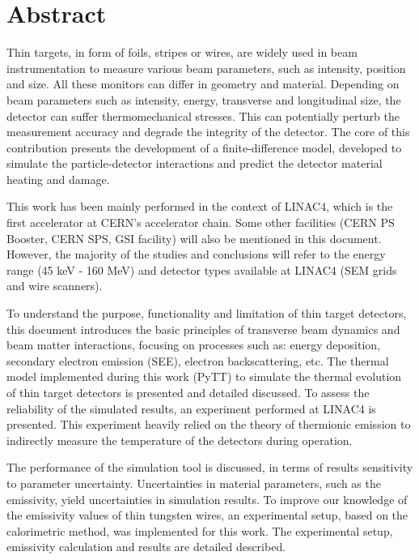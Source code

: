 
\chapter*{Abstract} \label{Abstract}

Thin targets, in form of foils, stripes or wires, are widely used 
in beam instrumentation to measure various beam parameters, such as intensity, position and size. All these monitors can differ in geometry and material. 
Depending on beam parameters such as intensity, energy, transverse and longitudinal size, the detector can suffer thermomechanical stresses. This can potentially perturb the measurement accuracy and degrade the integrity of the detector. The core of this contribution presents the development of a finite-difference model, developed to simulate the particle-detector interactions and predict the detector material heating and damage. 

This work has been mainly performed in the context of LINAC4, which is the first accelerator at CERN's accelerator chain. Some other facilities (CERN PS Booster, CERN SPS, GSI facility) will also be mentioned in this document. However, the majority of the studies and conclusions will refer to the energy range (45 keV - 160 MeV) and detector types available at LINAC4 (SEM grids and wire scanners). 

To understand the purpose, functionality and limitation of thin target detectors, this document introduces the basic principles of transverse beam dynamics and beam matter interactions, focusing on processes such as: energy deposition, secondary electron emission (SEE), electron backscattering, etc. The thermal model implemented during this work (PyTT) to simulate the thermal evolution of thin target detectors is presented and detailed discussed. To assess the reliability of the simulated results, an experiment performed at LINAC4 is presented. This experiment heavily relied on the theory of thermionic emission to indirectly measure the temperature of the detectors during operation. 

The performance of the simulation tool is discussed, in terms of results sensitivity to parameter uncertainty. Uncertainties in material parameters, such as the emissivity, yield uncertainties in simulation results. To improve our knowledge of the emissivity values of thin tungsten wires, an experimental setup, based on the calorimetric method, was implemented for this work. The experimental setup, emissivity calculation and results are detailed described. 

